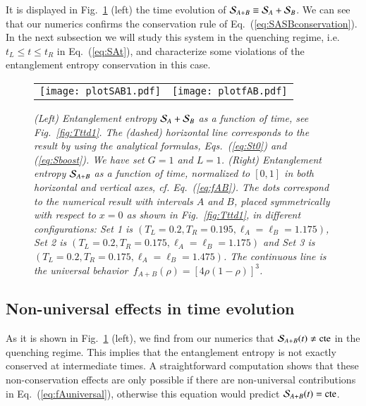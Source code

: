 \documentclass[epj]{webofc}
\begin{document}
It is displayed in Fig.~\ref{fig:SASBpeak} (left) the time evolution of ${\cal S}_{A+B} \equiv {\cal S}_A + {\cal S}_B$. We can see that our numerics confirms the conservation rule of Eq.~(\ref{eq:SASBconservation}). In the next subsection we will study this system in the quenching regime, i.e. $t_L \le t \le t_R$ in Eq.~(\ref{eq:SAt}), and characterize some violations of the entanglement entropy conservation in this case. 

\begin{figure*}[t]
\begin{tabular}{cc}
\texttt{[image: plotSAB1.pdf]} & 
\texttt{[image: plotfAB.pdf]}
\end{tabular}
\caption{\it (Left) Entanglement entropy ${\cal S}_A + {\cal S}_B$ as a function of time, see Fig.~\ref{fig:Tttd1}.  The (dashed) horizontal line corresponds to the result by using the analytical formulas, Eqs.~(\ref{eq:St0}) and (\ref{eq:Sboost}). We have set $G=1$ and $L=1$. (Right) Entanglement entropy ${\cal S}_{A+B}$ as a function of time, normalized to $[0,1]$ in both horizontal and vertical axes, cf. Eq.~(\ref{eq:fAB}). The dots correspond to the numerical result with intervals $A$ and $B$, placed symmetrically with respect to $x=0$ as shown in Fig.~\ref{fig:Tttd1}, in different configurations: Set 1 is $(T_L=0.2, T_R=0.195, \ell_A = \ell_B =  1.175)$, Set 2 is $(T_L=0.2, T_R=0.175,  \ell_A = \ell_B  = 1.175)$ and Set 3 is $(T_L=0.2, T_R=0.175,  \ell_A = \ell_B = 1.475)$. The continuous line is the universal behavior~$f_{A+B}(\rho) = \left[ 4\rho(1-\rho)\right]^3 $.}
\label{fig:SASBpeak}
\end{figure*}




\subsection{Non-universal effects in time evolution}
\label{subsec:non_universal}


As it is shown in Fig.~\ref{fig:SASBpeak} (left), we find from our numerics that ${\cal S}_{A+B}(t) \ne \textrm{cte}$ in the quenching regime. This implies that the entanglement entropy is not exactly conserved at intermediate times. A straightforward computation shows that these non-conservation effects are only possible if there are non-universal contributions in Eq.~(\ref{eq:fAuniversal}), otherwise this equation would predict ${\cal S}_{A+B}(t) = \textrm{cte}$.
\end{document}
